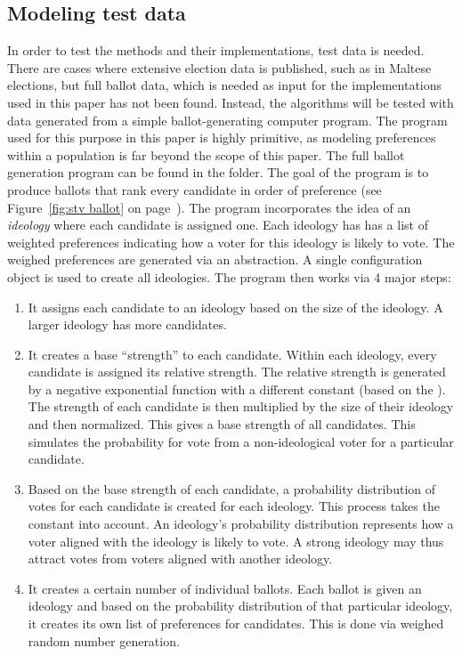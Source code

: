 \documentclass[12pt]{article}
\begin{document}
\subsection{Modeling test data}
\label{sec:vote-generation}
In order to test the methods and their implementations, test data is needed. There are cases where extensive election data is published, such as in Maltese elections, but full ballot data, which is needed as input for the implementations used in this paper has not been found. Instead, the algorithms will be tested with data generated from a simple ballot-generating computer program. The program used for this purpose in this paper is highly primitive, as modeling preferences within a population is far beyond the scope of this paper. The full ballot generation program can be found in the  folder. The goal of the program is to produce ballots that rank every candidate in order of preference (see Figure~\ref{fig:stv ballot} on page~\pageref{fig:stv ballot}). The program incorporates the idea of an \textit{ideology} where each candidate is assigned one. Each ideology has has a list of weighted preferences indicating how a voter for this ideology is likely to vote. The weighed preferences are generated via an abstraction. A single configuration object is used to create all ideologies.
The program then works via 4 major steps:
\begin{enumerate}
	\item It assigns each candidate to an ideology based on the size of the ideology. A larger ideology has more candidates.
	\item It creates a base ``strength'' to each candidate. Within each ideology, every candidate is assigned its relative strength. The relative strength is generated by a negative exponential function with a different constant (based on the ). The strength of each candidate is then multiplied by the size of their ideology and then normalized. This gives a base strength of all candidates. This simulates the probability for vote from a non-ideological voter for a particular candidate.
	\item Based on the base strength of each candidate, a probability distribution of votes for each candidate is created for each ideology. This process takes  the   constant into account. An ideology's probability distribution represents how a voter aligned with the ideology is likely to vote. A strong ideology may thus attract votes from voters aligned with another ideology.
	\item It creates a certain number of individual ballots. Each ballot is given an ideology and based on the probability distribution of that particular ideology, it creates its own list of preferences for candidates. This is done via weighed random number generation.
\end{enumerate}
\end{document}
